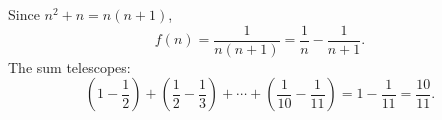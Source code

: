 Since $n^2+n=n(n+1)$,
\[
f(n)=\dfrac{1}{n(n+1)}=\dfrac{1}{n}-\dfrac{1}{n+1}.
\]
The sum telescopes:
\[
\left(1-\dfrac{1}{2}\right)+\left(\dfrac{1}{2}-\dfrac{1}{3}\right)+\cdots+\left(\dfrac{1}{10}-\dfrac{1}{11}\right)=1-\dfrac{1}{11}=\boxed{\dfrac{10}{11}}.
\]

